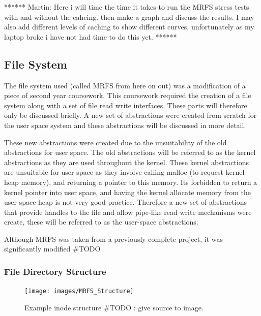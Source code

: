 \documentclass[a4paper]{report}
\begin{document}
******
Martin:
Here i will time the time it takes to run the MRFS stress tests with and without the cahcing. then make a graph and discuss the results. I may also add different levels of caching to show different curves, unfortunately as my laptop broke i have not had time to do this yet.
******






















\subsection{File System}

The file system used (called MRFS from here on out) was a modification of a piece of second year coursework. This coursework required the creation of a file system along with a set of file read write interfaces. These parts will therefore only be discussed briefly. A new set of abstractions were created from scratch for the user space system and these abstractions will be discussed in more detail.

These new abstractions were created due to the unsuitability of the old abstractions for user space. The old abstractions will be referred to as the kernel abstractions as they are used throughout the kernel. These kernel abstractions are unsuitable for user-space as they involve calling malloc (to request kernel heap memory), and returning a pointer to this memory. Its forbidden to return a kernel pointer into user space, and having the kernel allocate memory from the user-space heap is not very good practice. Therefore a new set of abstractions that provide handles to the file and allow pipe-like read write mechanisms were create, these will be referred to as the user-space abstractions.

Although MRFS was taken from a previously complete project, it was significantly modified #TODO

\subsubsection{File Directory Structure}

\begin{figure}[ht]
\centering
\texttt{[image: images/MRFS\_Structure]}
\caption{Example inode structure #TODO : give source to image.}
\label{fig:WinTitleBarScreen}
\end{figure}
\end{document}
